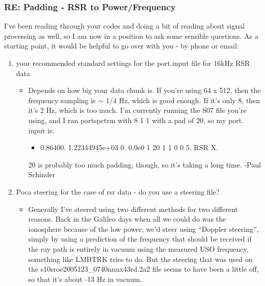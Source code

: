 \documentclass[crop=false,class=book]{standalone}
\begin{document}
        \subsubsection{\footnotesize RE: Padding - RSR to Power/Frequency}
        I've been reading through your codes and doing a bit of reading about signal processing as well, so I am now in a position to ask some sensible questions. As a starting point, it would be helpful to go over with you - by phone or email:
        \begin{enumerate}
            \item your recommended standard settings for the port.input file for 16kHz RSR data
            \begin{itemize}
                \item Depends on how big your data chunk is. If you’re using
                      64 x 512, then the frequency sampling is $\sim$ 1/4 Hz,
                      which is good enough.  If it’s only 8, then it’s 2 Hz,
                      which is too much. I’m currently running the S07 file
                      you’re using, and I ran portspctrm with 8 1 1 with a
                      pad of 20, so my port. input is:
                    \begin{itemize}
                        \item 0.86400. 1.22344945e+03 0. 0.0e0 1 20 1 1 0 0 5. RSR X.
                    \end{itemize}
                20 is probably too much padding, though, so it’s taking a long time. -Paul Schinder
            \end{itemize}
            \item Poca steering for the case of rsr data - do you use a
                  steering file?
            \begin{itemize}
                \item Generally I've steered using two different methods for
                      two different reasons.  Back in the Galileo days when
                      all we could do was the ionosphere because of the low
                      power, we'd steer using ``Doppler steering'', simply
                      by using a prediction of the frequency that should be
                      received if the ray path is entirely in vacuum using
                      the measured USO frequency, something like LMBTRK tries
                      to do.  But the steering that was used on the
                      s10sroe2005123\_0740nnnx43rd.2a2 file seems to have
                      been a little off, so that it's about -13 Hz in vacuum.

\end{itemize}
\end{enumerate}
\end{document}
